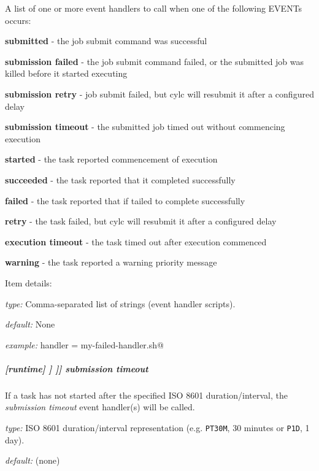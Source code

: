 A list of one or more event handlers to call when one of the following EVENTs occurs:
\begin{myitemize}
    \item {\bf submitted}      - the job submit command was successful
    \item {\bf submission failed}  - the job submit command failed, or the
                                   submitted job was killed before it started executing
    \item {\bf submission retry}   - job submit failed, but cylc will resubmit it
                                   after a configured delay
    \item {\bf submission timeout} - the submitted job timed out without commencing execution

    \item {\bf started}        - the task reported commencement of execution
    \item {\bf succeeded}      - the task reported that it completed successfully
    \item {\bf failed}         - the task reported that if tailed to complete successfully
    \item {\bf retry}          - the task failed, but cylc will resubmit it
                                  after a configured delay
    \item {\bf execution timeout}        - the task timed out after execution commenced
    \item {\bf warning}        - the task reported a warning priority message
\end{myitemize}

Item details:
\begin{myitemize}
    \item {\em type:} Comma-separated list of strings (event handler scripts).
    \item {\em default:} None
    \item {\em example:} \lstinline@failed handler = my-failed-handler.sh@
\end{myitemize}

\subparagraph[submission timeout]{[runtime] \textrightarrow [[\_\_NAME\_\_]] \textrightarrow [[[events]]] \textrightarrow submission timeout}
\label{runtime-event-hooks-submission-timeout}

If a task has not started after the specified ISO 8601 duration/interval, the
{\em submission timeout} event handler(s) will be called.
\begin{myitemize}
    \item {\em type:} ISO 8601 duration/interval representation (e.g.
 \lstinline=PT30M=, 30 minutes or \lstinline=P1D=, 1 day).
    \item {\em default:} (none)
\end{myitemize}

